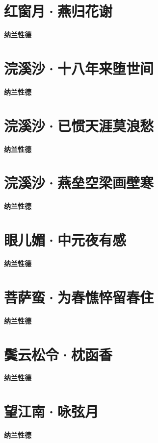 \documentclass[12pt,a4paper]{ctexbook}
\begin{document}
\section{红窗月·燕归花谢}
\textbf{纳兰性德}\par\vspace{0.5em}

\section{浣溪沙·十八年来堕世间}
\textbf{纳兰性德}\par\vspace{0.5em}

\section{浣溪沙·已惯天涯莫浪愁}
\textbf{纳兰性德}\par\vspace{0.5em}

\section{浣溪沙·燕垒空梁画壁寒}
\textbf{纳兰性德}\par\vspace{0.5em}

\section{眼儿媚·中元夜有感}
\textbf{纳兰性德}\par\vspace{0.5em}

\section{菩萨蛮·为春憔悴留春住}
\textbf{纳兰性德}\par\vspace{0.5em}

\section{鬓云松令·枕函香}
\textbf{纳兰性德}\par\vspace{0.5em}

\section{望江南·咏弦月}
\textbf{纳兰性德}\par\vspace{0.5em}
\end{document}
